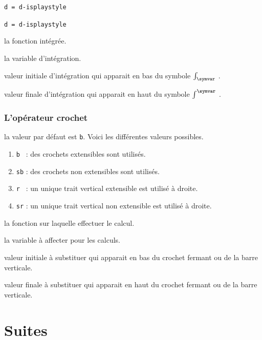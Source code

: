 \documentclass[12pt,a4paper]{book}
\theoremstyle{definition}
\newcommand\extraspace{
	\vspace{0.25em}
}
\newcommand\mwhyprefix[2]{%
	\texttt{#1 = #1-#2}%
}
\begin{document}
{{

\extraspace

 \hfill \mwhyprefix{d}{isplaystyle}

 \hfill \mwhyprefix{d}{isplaystyle}


 la fonction intégrée.

 la variable d'intégration.

 valeur initiale d'intégration qui apparait en bas du symbole $\int_{\symvar}$ .

 valeur finale d'intégration qui apparait en haut du symbole $\int^{\symvar}$ .





\subsubsection{L'opérateur \og crochet \fg}






\IDoption{} la valeur par défaut est \verb+b+. Voici les différentes valeurs possibles.
\begin{enumerate}
	\item \verb+b + : des crochets extensibles sont utilisés.

	\item \verb+sb+ : des crochets non extensibles sont utilisés.

	\item \verb+r + : un unique trait vertical extensible est utilisé à droite.

	\item \verb+sr+ : un unique trait vertical non extensible est utilisé à droite.
\end{enumerate}

 la fonction sur laquelle effectuer le calcul.

 la variable à affecter pour les calculs.

 valeur initiale à substituer qui apparait en bas du crochet fermant ou de la barre verticale.

 valeur finale à substituer qui apparait en haut du crochet fermant ou de la barre verticale.


\section{Suites}

}}
\end{document}
